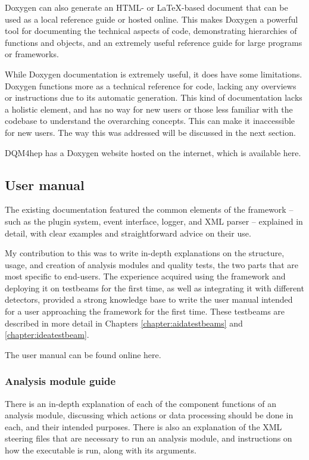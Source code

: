 Doxygen can also generate an HTML- or \LaTeX -based document that can be used as a local reference guide or hosted online. This makes Doxygen a powerful tool for documenting the technical aspects of code, demonstrating hierarchies of functions and objects, and an extremely useful reference guide for large programs or frameworks.

While Doxygen documentation is extremely useful, it does have some limitations. Doxygen functions more as a technical reference for code, lacking any overviews or instructions due to its automatic generation. This kind of documentation lacks a holistic element, and has no way for new users or those less familiar with the codebase to understand the overarching concepts. This can make it inaccessible for new users. The way this was addressed will be discussed in the next section.

DQM4hep has a Doxygen website hosted on the internet, which is available here\cite{dqm4hep-doxygen}.

\subsection{User manual} %
The existing documentation featured the common elements of the framework -- such as the plugin system, event interface, logger, and XML parser -- explained in detail, with clear examples and straightforward advice on their use.

My contribution to this was to write in-depth explanations on the structure, usage, and creation of analysis modules and quality tests, the two parts that are most specific to end-users. The experience acquired using the framework and deploying it on testbeams for the first time, as well as integrating it with different detectors, provided a strong knowledge base to write the user manual intended for a user approaching the framework for the first time. These testbeams are described in more detail in Chapters \ref{chapter:aidatestbeams} and \ref{chapter:ideatestbeam}.

The user manual can be found online here\cite{dqm4hep-user-manual}.

\subsubsection*{Analysis module guide}
There is an in-depth explanation of each of the component functions of an analysis module, discussing which actions or data processing should be done in each, and their intended purposes. There is also an explanation of the \acrshort{XML} steering files that are necessary to run an analysis module, and instructions on how the executable is run, along with its arguments.

